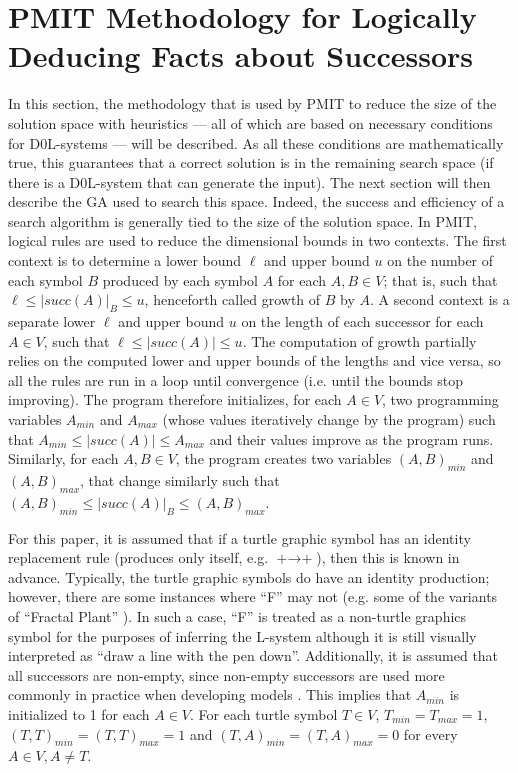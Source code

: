 \documentclass{llncs}
\begin{document}
	\section{PMIT Methodology for Logically Deducing Facts about Successors}\label{section:rules}
	
	In this section, the methodology that is used by PMIT to reduce the size of the solution space with heuristics --- all of which are based on necessary conditions for D0L-systems --- will be described. As all these conditions are mathematically true, this guarantees that a correct solution is in the remaining search space (if there is a D0L-system that can generate the input). The next section will then describe the GA used to search this space. Indeed, the success and efficiency of a search algorithm is generally tied to the size of the solution space. In PMIT, logical rules are used to reduce the dimensional bounds in two contexts. The first context is to determine a lower bound $\ell$ and upper bound $u$ on the number of each symbol $B$ produced by each symbol $A$ for each $A,B \in V$; that is, such that $\ell \le |succ(A)|_{B} \le u$, henceforth called growth of $B$ by $A$. A second context is a separate lower $\ell$ and upper bound $u$ on the length of each successor for each $A \in V$, such that $\ell \leq |succ(A)| \leq u$. The computation of growth partially relies on the computed lower and upper bounds of the lengths and vice versa, so all the rules are run in a loop until convergence (i.e. until the bounds stop improving). The program therefore initializes, for each $A \in V$, two programming variables $A_{min}$ and $A_{max}$ (whose values iteratively change by the program) such that $A_{min} \leq |succ(A)| \leq A_{max}$ and their values improve as the program runs. Similarly, for each $A,B \in V$, the program creates two variables $(A,B)_{min}$ and $(A,B)_{max}$, that change similarly such that $(A,B)_{min} \leq |succ(A)|_{B} \leq (A,B)_{max}$. 
	
	For this paper, it is assumed that if a turtle graphic symbol has an identity replacement rule (produces only itself, e.g. $\text{+} \rightarrow \text{+}$), then this is known in advance. Typically, the turtle graphic symbols do have an identity production; however, there are some instances where ``F'' may not (e.g. some of the variants of ``Fractal Plant'' \cite{beauty}). In such a case, ``F'' is treated as a non-turtle graphics symbol for the purposes of inferring the L-system although it is still visually interpreted as ``draw a line with the pen down''. Additionally, it is assumed that all successors are non-empty, since non-empty successors are used more commonly in practice when developing models \cite{beauty}. This implies that $A_{min}$ is initialized to 1 for each $A \in V$. For each turtle symbol $T \in V$, $T_{min} = T_{max} = 1$,$(T,T)_{min} = (T,T)_{max} = 1$ and $(T,A)_{min} = (T,A)_{max} = 0$ for every $A \in V, A \neq T$.
	
\end{document}

